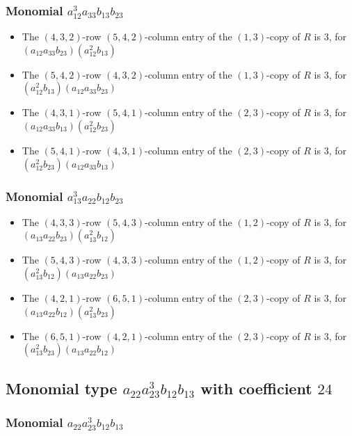 \documentclass{article}
\begin{document}
\subsubsection{Monomial $ a_{12}^{3} a_{33} b_{13} b_{23} $}

\begin{itemize}
\item The $(4, 3, 2)$-row $(5, 4, 2)$-column entry of the $ \left(1, 3\right) $-copy of $R$ is $ 3 $, for $( a_{12} a_{33} b_{23} )( a_{12}^{2} b_{13} )$ 
\item The $(5, 4, 2)$-row $(4, 3, 2)$-column entry of the $ \left(1, 3\right) $-copy of $R$ is $ 3 $, for $( a_{12}^{2} b_{13} )( a_{12} a_{33} b_{23} )$ 
\item The $(4, 3, 1)$-row $(5, 4, 1)$-column entry of the $ \left(2, 3\right) $-copy of $R$ is $ 3 $, for $( a_{12} a_{33} b_{13} )( a_{12}^{2} b_{23} )$ 
\item The $(5, 4, 1)$-row $(4, 3, 1)$-column entry of the $ \left(2, 3\right) $-copy of $R$ is $ 3 $, for $( a_{12}^{2} b_{23} )( a_{12} a_{33} b_{13} )$ 
\end{itemize}
\subsubsection{Monomial $ a_{13}^{3} a_{22} b_{12} b_{23} $}

\begin{itemize}
\item The $(4, 3, 3)$-row $(5, 4, 3)$-column entry of the $ \left(1, 2\right) $-copy of $R$ is $ 3 $, for $( a_{13} a_{22} b_{23} )( a_{13}^{2} b_{12} )$ 
\item The $(5, 4, 3)$-row $(4, 3, 3)$-column entry of the $ \left(1, 2\right) $-copy of $R$ is $ 3 $, for $( a_{13}^{2} b_{12} )( a_{13} a_{22} b_{23} )$ 
\item The $(4, 2, 1)$-row $(6, 5, 1)$-column entry of the $ \left(2, 3\right) $-copy of $R$ is $ 3 $, for $( a_{13} a_{22} b_{12} )( a_{13}^{2} b_{23} )$ 
\item The $(6, 5, 1)$-row $(4, 2, 1)$-column entry of the $ \left(2, 3\right) $-copy of $R$ is $ 3 $, for $( a_{13}^{2} b_{23} )( a_{13} a_{22} b_{12} )$ 
\end{itemize}
\subsection{Monomial type $ a_{22} a_{23}^{3} b_{12} b_{13} $ with coefficient $ 24 $}

\subsubsection{Monomial $ a_{22} a_{23}^{3} b_{12} b_{13} $}
\end{document}
